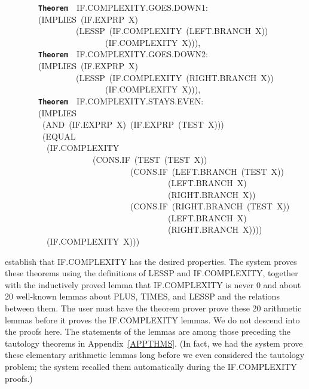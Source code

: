 \documentclass[11pt]{book}
\newenvironment{pubasis}{\begin{flushleft}\ttfamily\small}{\normalsize\rmfamily\end{flushleft}}
\newcommand{\axiomordefinition}[1]{\vspace{6pt}\texttt{\textbf{#1}}}
\begin{document}
\begin{pubasis}
~~~~~~~~\axiomordefinition{Theorem}~~IF.COM\-PLEX\-I\-TY.GOES.DOWN1:\\
~~~~~~~~(IMPLIES~(IF.EXPRP~X)\\
~~~~~~~~~~~~~~~~~(LESSP~(IF.COM\-PLEX\-I\-TY~(LEFT.BRANCH~X))\\
~~~~~~~~~~~~~~~~~~~~~~~~(IF.COM\-PLEX\-I\-TY~X))),\\

~~~~~~~~\axiomordefinition{Theorem}~~IF.COM\-PLEX\-I\-TY.GOES.DOWN2:\\
~~~~~~~~(IMPLIES~(IF.EXPRP~X)\\
~~~~~~~~~~~~~~~~~(LESSP~(IF.COM\-PLEX\-I\-TY~(RIGHT.BRANCH~X))\\
~~~~~~~~~~~~~~~~~~~~~~~~(IF.COM\-PLEX\-I\-TY~X))),\\

~~~~~~~~\axiomordefinition{Theorem}~~IF.COM\-PLEX\-I\-TY.STAYS.EVEN:\\
~~~~~~~~(IMPLIES\\
~~~~~~~~~(AND~(IF.EXPRP~X)~(IF.EXPRP~(TEST~X)))\\
~~~~~~~~~(EQUAL\\
~~~~~~~~~~(IF.COM\-PLEX\-I\-TY\\
~~~~~~~~~~~~~~~~~~~~~(CONS.IF~(TEST~(TEST~X))\\
~~~~~~~~~~~~~~~~~~~~~~~~~~~~~~(CONS.IF~(LEFT.BRANCH~(TEST~X))\\
~~~~~~~~~~~~~~~~~~~~~~~~~~~~~~~~~~~~~~~(LEFT.BRANCH~X)\\
~~~~~~~~~~~~~~~~~~~~~~~~~~~~~~~~~~~~~~~(RIGHT.BRANCH~X))\\
~~~~~~~~~~~~~~~~~~~~~~~~~~~~~~(CONS.IF~(RIGHT.BRANCH~(TEST~X))\\
~~~~~~~~~~~~~~~~~~~~~~~~~~~~~~~~~~~~~~~(LEFT.BRANCH~X)\\
~~~~~~~~~~~~~~~~~~~~~~~~~~~~~~~~~~~~~~~(RIGHT.BRANCH~X))))\\
~~~~~~~~~~(IF.COM\-PLEX\-I\-TY~X)))\\
\end{pubasis}
establish that IF.COM\-PLEX\-I\-TY has the desired properties.  The system proves these
theorems using the definitions of LESSP and IF.COM\-PLEX\-I\-TY,
together with the inductively proved lemma that IF.COM\-PLEX\-I\-TY is never 0
and about 20 well-known lemmas about PLUS, TIMES,
and LESSP and the relations between them.
The user must have the theorem prover prove these 20 arithmetic
lemmas before it proves the IF.COM\-PLEX\-I\-TY lemmas.  We do not descend into
the proofs here.  The statements of the lemmas are among those preceding
the tautology theorems in Appendix~\ref{APPTHMS}.  (In fact, we had the system
prove these elementary arithmetic lemmas long before we even considered
the tautology problem; the system recalled them automatically during
the IF.COM\-PLEX\-I\-TY proofs.)
\end{document}
